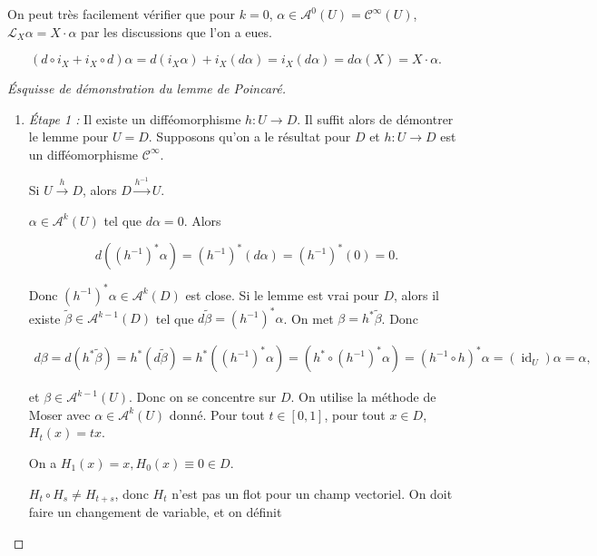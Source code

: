 \documentclass[french]{article}
\theoremstyle{definition}
\begin{document}
On peut très facilement vérifier que pour \(k = 0\), \(\alpha \in \mathscr{A}^{0}(U) = \mathcal{C}^{\infty}(U)\), \(\mathcal{L}_X \alpha = X \cdot \alpha\) par les discussions que l'on a eues.

\[(d \circ i_X + i_X \circ d)\alpha = d(i_X \alpha) + i_X (d \alpha) = i_X (d \alpha) = d \alpha(X)= X \cdot \alpha.\]

\begin{proof}[\'Esquisse de démonstration du lemme de Poincaré]

  \

  \begin{enumerate}
    \item \emph{\'Etape 1 :} Il existe un difféomorphisme \(h : U \longrightarrow D\). Il suffit alors de démontrer le lemme pour \(U = D\). Supposons qu'on a le résultat pour \(D\) et \(h : U \longrightarrow D\) est un difféomorphisme \(\mathcal{C}^{\infty}\).

    Si \( U \stackrel{h}{\longrightarrow} D\), alors \(D \stackrel{h ^{-1}}{\longrightarrow} U \).

    \(\alpha \in \mathscr{A}^{k}(U)\) tel que \(d \alpha = 0\). Alors

    \[d((h ^{-1})^{*} \alpha) = (h ^{-1})^{*}(d \alpha) = (h ^{-1})^{*}(0)=0.\]

    Donc \((h ^{-1})^{*} \alpha \in \mathscr{A}^{k}(D)\) est close. Si le lemme est vrai pour \(D\), alors il existe \(\widetilde{\beta} \in \mathscr{A}^{k-1}(D)\) tel que \(d \widetilde{\beta} = (h ^{-1})^{*} \alpha\). On met \(\beta = h ^{*} \widetilde{ \beta}\). Donc

    \begin{gather*}
      d \beta = d (h ^{*} \widetilde{\beta}) = h ^{*}(d \widetilde{\beta}) = h ^{*}((h ^{-1})^{*} \alpha) = (h ^{*} \circ (h ^{-1})^{*} \alpha) = (h ^{-1} \circ h)^{*}\alpha = (\operatorname{id}_U)\alpha = \alpha,
    \end{gather*}

    et \(\beta \in \mathscr{A}^{k-1}(U)\). Donc on se concentre sur \(D\). On utilise la méthode de Moser avec \(\alpha \in \mathscr{A}^{k}(U)\) donné. Pour tout \(t \in [0,1]\), pour tout \(x \in D\), \(H_t(x) = tx\).

    On a \(H_1(x)=x, H_0(x)\equiv 0 \in D\).

    {\selectfont{}\relax} \(H_t \circ H_s \neq H _{t+s}\), donc \(H_t\) n'est pas un flot pour un champ vectoriel. On doit faire un changement de variable, et on définit


\end{enumerate}
\end{proof}
\end{document}
